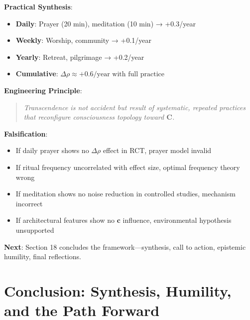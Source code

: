 \documentclass[11pt,a4paper]{article}
\theoremstyle{definition}
\theoremstyle{remark}
\newcommand{\cc}{\mathbf{c}}
\begin{document}
\begin{enumerate}
\begin{protocol}
\begin{mdframed}[backgroundcolor=green!10,linewidth=2pt,linecolor=green!70!black]
\textbf{Practical Synthesis}:
\begin{itemize}[nosep]
    \item \textbf{Daily}: Prayer (20 min), meditation (10 min) → +0.3/year
    \item \textbf{Weekly}: Worship, community → +0.1/year
    \item \textbf{Yearly}: Retreat, pilgrimage → +0.2/year
    \item \textbf{Cumulative}: \(\Delta\rho \approx +0.6/\text{year with full practice}\)
\end{itemize}

\textbf{Engineering Principle}:
\begin{quote}
\textit{Transcendence is not accident but result of systematic, repeated practices that reconfigure consciousness topology toward \(\mathbf{C}\).}
\end{quote}

\textbf{Falsification}:
\begin{itemize}[nosep]
    \item If daily prayer shows no \(\Delta\rho\) effect in RCT, prayer model invalid
    \item If ritual frequency uncorrelated with effect size, optimal frequency theory wrong
    \item If meditation shows no noise reduction in controlled studies, mechanism incorrect
    \item If architectural features show no \(\cc\) influence, environmental hypothesis unsupported
\end{itemize}

\textbf{Next}: Section 18 concludes the framework—synthesis, call to action, epistemic humility, final reflections.
\end{mdframed}


\section{Conclusion: Synthesis, Humility, and the Path Forward}


\end{protocol}
\end{enumerate}
\end{document}
